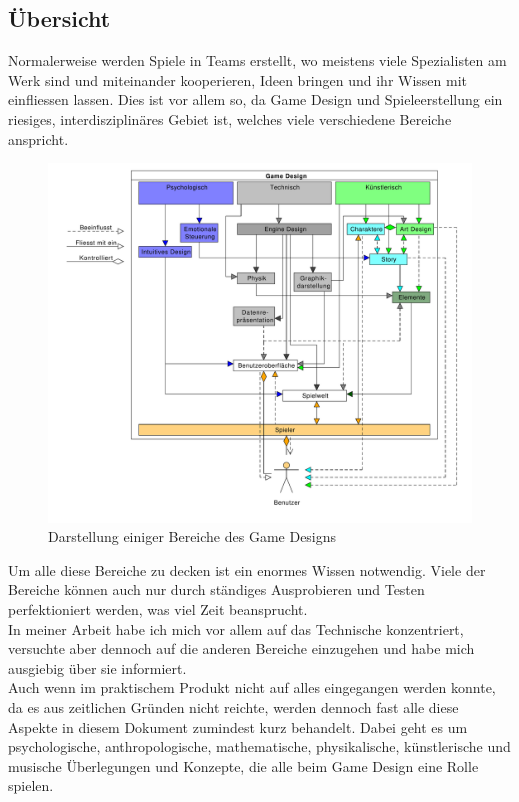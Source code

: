 \documentclass[12pt,a4paper,titlepage]{article}
\begin{document}
	\subsection{Übersicht}
		Normalerweise werden Spiele in Teams erstellt, wo meistens viele Spezialisten am Werk sind und miteinander kooperieren, Ideen bringen und ihr Wissen mit einfliessen lassen.
		Dies ist vor allem so, da Game Design und Spieleerstellung ein riesiges, interdisziplinäres Gebiet ist, welches viele verschiedene Bereiche anspricht.
		\begin{figure}[h!]
  			\centering
			\includegraphics[keepaspectratio=true,scale=0.4]{gamedesign.pdf}
  			\caption{Darstellung einiger Bereiche des Game Designs}
		\end{figure}
		Um alle diese Bereiche zu decken ist ein enormes Wissen notwendig. Viele der Bereiche können auch nur durch ständiges Ausprobieren und Testen perfektioniert werden, was viel Zeit beansprucht.\\
		
		In meiner Arbeit habe ich mich vor allem auf das Technische konzentriert, versuchte aber dennoch auf die anderen Bereiche einzugehen und habe mich ausgiebig über sie informiert.\\
		Auch wenn im praktischem Produkt nicht auf alles eingegangen werden konnte, da es aus zeitlichen Gründen nicht reichte, werden dennoch fast alle diese Aspekte in diesem Dokument zumindest kurz behandelt.
		Dabei geht es um psychologische, anthropologische, mathematische, physikalische, künstlerische und musische Überlegungen und Konzepte, die alle beim Game Design eine Rolle spielen.
	
\end{document}
